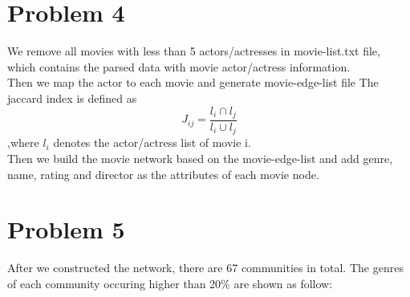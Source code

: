 \documentclass{article}
\begin{document}
\section{Problem 4}
We remove all movies with less than 5 actors/actresses in movie-list.txt file, which contains the parsed data with movie actor/actress information.\\
Then we map the actor to each movie and generate movie-edge-list file
The jaccard index is defined as $$J_{ij}=\frac{l_{i} \cap l_{j} }{l_{i}\cup l_{j}}$$
,where $l_{i}$ denotes the actor/actress list of movie i.\\
Then we build the movie network based on the movie-edge-list and add genre, name, rating and director as the attributes of each movie node.
\section{Problem 5}
After we constructed the network, there are 67 communities in total. The genres of each community occuring higher than 20\% are shown as follow:
\end{document}
